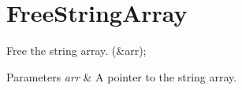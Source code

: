 \hypertarget{FreeStringArray-example}{}\section{Free\+String\+Array}
Free the string array. (\&arr); 
\begin{DoxyParams}{Parameters}
{\em arr} & A pointer to the string array.\\
\hline
\end{DoxyParams}

\begin{DoxyCodeInclude}
\end{DoxyCodeInclude}
 